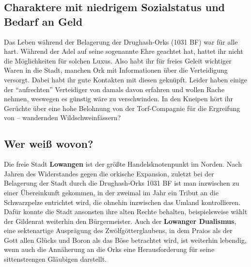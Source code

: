 \neuespalte

\subsection*{Charaktere mit niedrigem Sozialstatus und Bedarf an Geld}
Das Leben während der Belagerung der Drughash-Orks (1031 BF) war für alle hart.
Während der Adel auf seine sogenannte Ehre geachtet hat, hattet ihr nicht die Möglichkeiten für solchen Luxus.
Also habt ihr für freies Geleit wichtiger Waren in die Stadt, manchen Ork mit Informationen über die Verteidigung versorgt.
Dabei habt ihr gute Kontakten mit diesen geknüpft.
Leider haben einige der \enquote{aufrechten} Verteidiger von damals davon erfahren und wollen Rache nehmen, weswegen es günstig wäre zu verschwinden.
In den Kneipen hört ihr Gerüchte über eine hohe Belohnung von der Torf-Compagnie für die Ergreifung von -- wandernden Wildschweinfässern?

\spaltenende

\subsection*{Wer weiß wovon?}

\spaltenanfang



Die freie Stadt \textbf{Lowangen} ist der größte Handelsknotenpunkt im Norden.
Nach Jahren des Widerstandes gegen die orkische Expansion, zuletzt bei der Belagerung der Stadt durch die Drughash-Orks 1031 BF ist man inzwischen zu einer Übereinkunft gekommen, in der zweimal im Jahr ein Tribut an die Schwarzpelze entrichtet wird, die ohnehin inzwischen das Umland kontrollieren.
Dafür konnte die Stadt ansonsten ihre alten Rechte behalten, beispielsweise wählt der Gildenrat weiterhin den Bürgermeister.
Auch der \textbf{Lowanger Dualismus}, eine sektenartige Ausprägung des Zwölfgötterglaubens, in dem Praios als der Gott allen Glücks und Boron als das Böse betrachtet wird, ist weiterhin lebendig, wenn auch die Annäherung an die Orks eine Herausforderung für seine sittenstrengen Gläubigen darstellt.


